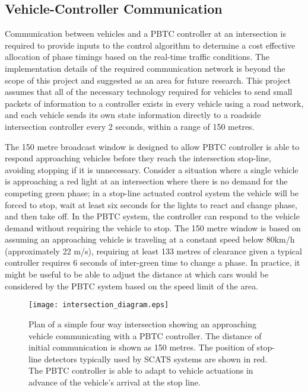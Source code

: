 \subsection{Vehicle-Controller Communication}

Communication between vehicles and a PBTC controller at an intersection is required to provide inputs to the control algorithm to determine a cost effective allocation of phase timings based on the real-time traffic conditions. The implementation details of the required communication network is beyond the scope of this project and suggested as an area for future research. This project assumes that all of the necessary technology required for vehicles to send small packets of information to a controller exists in every vehicle using a road network, and each vehicle sends its own state information directly to a roadside intersection controller every 2 seconds, within a range of 150 metres.

The 150 metre broadcast window is designed to allow PBTC controller is able to respond approaching vehicles before they reach the intersection stop-line, avoiding stopping if it is unnecessary. Consider a situation where a single vehicle is approaching a red light at an intersection where there is no demand for the competing green phase; in a stop-line actuated control system the vehicle will be forced to stop, wait at least six seconds for the lights to react and change phase, and then take off. In the PBTC system, the controller can respond to the vehicle demand without requiring the vehicle to stop. The 150 metre window is based on assuming an approaching vehicle is traveling at a constant speed below 80km/h (approximately 22 m/s), requiring at least 133 metres of clearance given a typical controller requires 6 seconds of inter-green time to change a phase. In practice, it might be useful to be able to adjust the distance at which cars would be considered by the PBTC system based on the speed limit of the area. 

\begin{figure}[]
\centering
	\texttt{[image: intersection\_diagram.eps]}
	\caption[Plan of a simple four way intersection showing an approaching vehicle communicating with a traffic controller.]{ Plan of a simple four way intersection showing an approaching vehicle communicating with a PBTC controller. The distance of initial communication is shown as 150 metres. The position of stop-line detectors typically used by SCATS systems are shown in red. The PBTC controller is able to adapt to vehicle actuations in advance of the vehicle's arrival at the stop line. }
\label{intersectiondiagram}
\end{figure}

